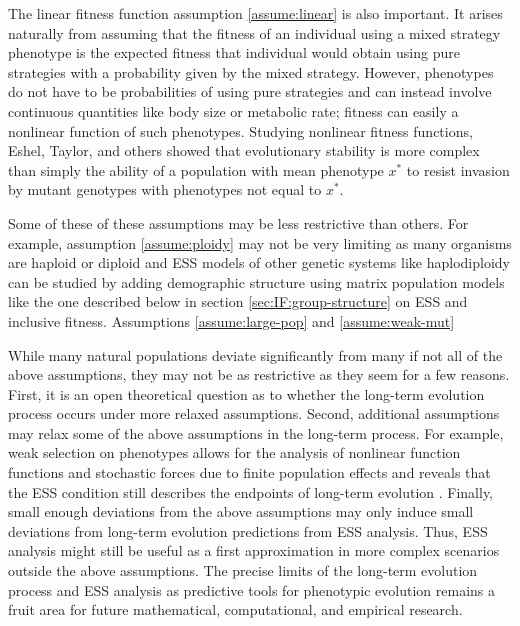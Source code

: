\documentclass[11pt]{article}
\newcommand{\ess}[1]{#1^*}
\begin{document}
The linear fitness function assumption \ref{assume:linear} is also important. It arises naturally from assuming that the fitness of an individual using a mixed strategy phenotype is the expected fitness that individual would obtain using pure strategies with a probability given by the mixed strategy. However, phenotypes do not have to be probabilities of using pure strategies and can instead involve continuous quantities like body size or metabolic rate; fitness can easily a nonlinear function of such phenotypes. Studying nonlinear fitness functions, Eshel, Taylor, and others \cite{Eshel:Motro:1981,Eshel:1983,Taylor:1989,Christiansen:1991} showed that evolutionary stability is more complex than simply the ability of a population with mean phenotype $\ess{x}$ to resist invasion by mutant genotypes with phenotypes not equal to $\ess{x}$.

Some of these of these assumptions may be less restrictive than others. For example, assumption \ref{assume:ploidy} may not be very limiting as many organisms are haploid or diploid and ESS models of other genetic systems like haplodiploidy can be studied by adding demographic structure using matrix population models \cite{Taylor:1990,Taylor:Frank:1996,Frank:1998} like the one described below in section \ref{sec:IF:group-structure} on ESS and inclusive fitness. Assumptions \ref{assume:large-pop} and \ref{assume:weak-mut}


While many natural populations deviate significantly from many if not all of the above assumptions, they may not be as restrictive as they seem for a few reasons. First, it is an open theoretical question as to whether the long-term evolution process occurs under more relaxed assumptions. Second, additional assumptions may relax some of the above assumptions in the long-term process. For example, weak selection on phenotypes allows for the analysis of nonlinear function functions and stochastic forces due to finite population effects and reveals that the ESS condition still describes the endpoints of long-term evolution \cite{Rousset:Billiard:2000,Rousset:2004,VanCleve:2015}. Finally, small enough deviations from the above assumptions may only induce small deviations from long-term evolution predictions from ESS analysis. Thus, ESS analysis might still be useful as a first approximation in more complex scenarios outside the above assumptions. The precise limits of the long-term evolution process and ESS analysis as predictive tools for phenotypic evolution remains a fruit area for future  mathematical, computational, and empirical research.
\end{document}
